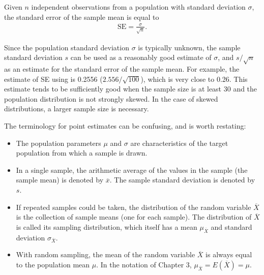 \begin{spacing}{1.5}

\begin{termBox}{
Given $n$ independent observations from a population with standard deviation $\sigma$, the standard error of the sample mean is equal to \vspace{-1mm}
\begin{align*}
\text{SE} = \frac{\sigma}{\sqrt{n}}.
\label{seOfXBar}
\end{align*}\vspace{-3mm}%
}
\end{termBox}

Since the population standard deviation $\sigma$ is typically unknown, the sample standard deviation $s$ can be used as a reasonably good estimate of $\sigma$, and $s / \sqrt{n}$ as an estimate for the standard error of the sample mean. For example, the estimate of SE using  is 0.2556 ($2.556 / \sqrt{100}$), which is very close to 0.26.  This estimate tends to be sufficiently good when the sample size is at least 30 and the population distribution is not strongly skewed. In the case of skewed distributions, a larger sample size is necessary.


The terminology for point estimates can be confusing, and is worth restating:  

\begin{itemize}
\setlength{\itemsep}{0mm}	
	\item The population parameters $\mu$ and $\sigma$ are characteristics of the target population from which a sample is drawn. 
	
	\item In a single sample, the arithmetic average of the values in the sample (the sample mean) is denoted by $\overline{x}$. The sample standard deviation is denoted by $s$. 
	
	\item If repeated samples could be taken, the distribution of the random variable $\overline{X}$ is the collection of sample means (one for each sample). The distribution of $\overline{X}$ is called its sampling distribution, which itself has a mean $\mu_{\overline{X}}$ and standard deviation $\sigma_{\overline{X}}$. 
	
	\item With random sampling, the mean of the random variable $\overline{X}$ is always equal to the population mean $\mu$.  In the notation of Chapter 3, $\mu_{\overline{X}} = E(\overline{X}) = \mu$.
	

\end{itemize}
\end{spacing}
